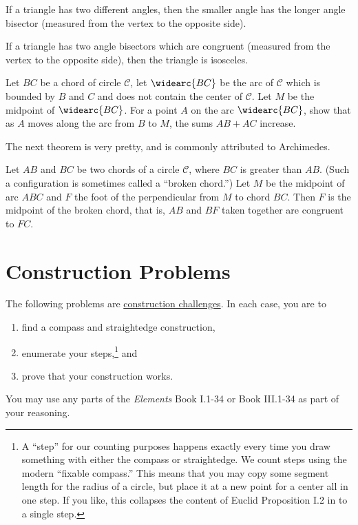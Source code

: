 \begin{conjecture}
If a triangle has two different angles, then the smaller angle has the longer angle bisector (measured from the vertex to the opposite side).
\end{conjecture}

\begin{conjecture}
If a triangle has two angle bisectors which are congruent (measured from the vertex to the opposite side), then the triangle is isosceles.
\end{conjecture}

\begin{conjecture}
Let $BC$ be a chord of circle $\mathcal{C}$, let $\widearc{BC}$ be the arc of $\mathcal{C}$ which is bounded by $B$ and $C$ and does not contain the center of $\mathcal{C}$.
Let $M$ be the midpoint of $\widearc{BC}$.
For a point $A$ on the arc $\widearc{BC}$, show that as $A$ moves along the arc from $B$ to $M$, the sums $AB+AC$ increase.
\end{conjecture}


The next theorem is very pretty, and is commonly attributed to Archimedes.

\begin{conjecture} Let $AB$ and $BC$ be two chords of a circle $\mathcal{C}$, where $BC$ is greater than $AB$.
(Such a configuration is sometimes called a ``broken chord.'')
Let $M$ be the midpoint of arc ${ABC}$ and $F$ the foot of the perpendicular from $M$ to chord $BC$.
Then $F$ is the midpoint of the broken chord, that is, $AB$ and $BF$ taken together are congruent to $FC$.
\end{conjecture}



\chapter{Construction Problems}

The following problems are \underline{construction challenges}. In each case, you are to
\begin{enumerate}
\item find a compass and straightedge construction,
\item enumerate your steps,\footnote{A ``step'' for our counting purposes happens exactly every time you draw something with either the compass or straightedge.
We count steps using the modern ``fixable compass.''
This means that you may copy some segment length for the radius of a circle, but place it at a new point for a center all in one step.
If you like, this collapses the content of Euclid Proposition I.2 in to a single step.} and
\item prove that your construction works.
\end{enumerate}
You may use any parts of the \emph{Elements} Book I.1-34 or Book III.1-34 as part of your reasoning.



